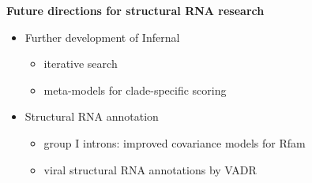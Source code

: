 \documentclass[landscape]{slides}
\begin{document}
\begin{slide}


  \vfill
\end{slide}
\begin{slide}
\begin{center}
  \textbf{Future directions for structural RNA research}
\end{center}

  \begin{itemize}
  \item Further development of Infernal
    \begin{itemize}
    \item iterative search
    \item meta-models for clade-specific scoring
    \end{itemize}
  \item Structural RNA annotation
    \begin{itemize}
    \item group I introns: improved covariance models for Rfam
    \item viral structural RNA annotations by VADR
    \end{itemize}
  \end{itemize}    
    
  \vfill

\end{slide}
\end{document}
